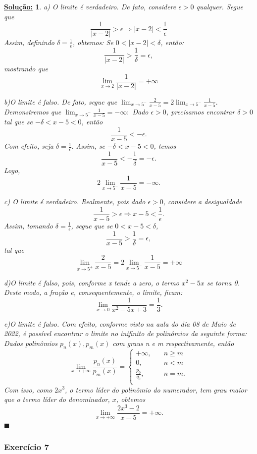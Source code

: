 \documentclass{article}
\newtheorem*{sol*}{\underline{Solu\c c\~ao:}}
\renewcommand\qedsymbol{$\blacksquare$}
\begin{document}
\begin{sol*}
a) O limite \'e verdadeiro. De fato, considere $\epsilon > 0$ qualquer. Segue que 
$$
\frac{1}{|x - 2|} > \epsilon \Rightarrow |x - 2| < \frac{1}{\epsilon}
$$
Assim, definindo $\delta = \frac{1}{\epsilon}$, obtemos: Se $0 < |x - 2| < \delta$, ent\~ao:
$$
\frac{1}{|x - 2|} > \frac{1}{\delta} = \epsilon,
$$
mostrando que 
$$
\lim_{x\to2}\frac{1}{|x - 2|}=+\infty
$$

b)O limite \'e falso. De fato, segue que  $\lim_{x\to5^-}\frac{2}{x - 5} = 2\lim_{x\to5^-}\frac{1}{x - 5}.$ Demonstremos que $\lim_{x\to5^-}\frac{1}{x - 5} = -\infty:$ Dado $\epsilon > 0$, precisamos encontrar $\delta > 0$ tal que se $-\delta < x - 5< 0$, ent\~ao
$$
\frac{1}{x - 5} < -\epsilon.
$$ 
Com efeito, seja $\delta = \frac{1}{\epsilon}.$ Assim, se $-\delta < x - 5< 0$, temos
$$
\frac{1}{x - 5} < -\frac{1}{\delta} = -\epsilon.
$$
Logo, 
$$
2\lim_{x\to5^-}\frac{1}{x - 5} = -\infty.
$$

c) O limite \'e verdadeiro. Realmente, pois dado $\epsilon > 0$, considere a desigualdade
$$
\frac{1}{x - 5} > \epsilon \Rightarrow x - 5 < \frac{1}{\epsilon}.
$$
Assim, tomando $\delta = \frac{1}{\epsilon}$, segue que se $0 < x - 5 < \delta$, 
$$
\frac{1}{x - 5} > \frac{1}{\delta} = \epsilon,
$$
tal que 
$$
\lim_{x\to5^+}\frac{2}{x - 5} = 2\lim_{x\to5^-}\frac{1}{x - 5} = +\infty
$$

d)O limite \'e falso, pois, conforme x tende a zero, o termo $x^2 - 5x$ se torna 0. Deste modo, a fra\c c\~ao e, consequentemente, o limite, ficam:
$$
\lim_{x\to0}\frac{1}{x^2 - 5x + 3} = \frac{1}{3}.
$$

e)O limite \'e falso. Com efeito, conforme visto na aula do dia 08 de Maio de 2022, \'e poss\'ivel encontrar o limite no inifinito de polin\^omios da seguinte forma: Dados polin\^omios $p_n(x), p_m(x)$ com graus n e m respectivamente, ent\~ao
$$
\lim_{x\to+\infty}\frac{p_n(x)}{p_m(x)} = 
\left\{\begin{array}{ll}
	+\infty, & \quad n\geq{m}\\
	0, & \quad n < m\\
	\frac{p_0}{q_0}, & \quad n = m.\\
\end{array}\right.
$$
Com isso, como $2x^3$, o termo l\'ider do polin\^omio do numerador, tem grau maior que o termo l\'ider do denominador, $x$, obtemos
$$
\lim_{x\to+\infty}\frac{2x^3 - 2}{x-5} = +\infty.
$$
\qedsymbol
\end{sol*}

\subsubsection{Exerc\'icio 7}
\end{document}
